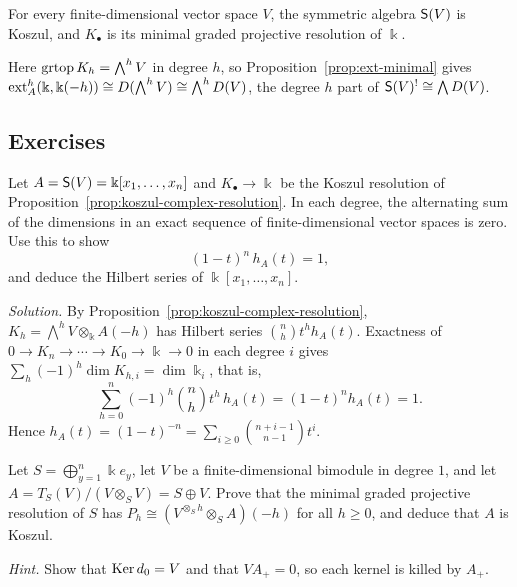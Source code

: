 \begin{corollary}\label{prop:polynomial-koszul}
For every finite-dimensional vector space $V$, the symmetric algebra $\mathsf{S}(V)$ is Koszul, and $K_\bullet$ is its minimal graded projective resolution of $\Bbbk$.
\end{corollary}

Here $\operatorname{grtop}\nolimits K_h=\bigwedge^hV$ in degree $h$, so Proposition~\ref{prop:ext-minimal} gives $\operatorname{ext}\nolimits_A^h(\Bbbk,\Bbbk(-h))\cong D(\bigwedge^hV)\cong\bigwedge^hD(V)$, the degree $h$ part of $\mathsf{S}(V)^!\cong\bigwedge D(V)$.

\subsection{Exercises}

\begin{exercise}\label{ex:hilbert-polynomial}
Let $A=\mathsf{S}(V)=\Bbbk[x_1,\ldots,x_n]$ and $K_\bullet\to\Bbbk$ be the Koszul resolution of Proposition~\ref{prop:koszul-complex-resolution}.
In each degree, the alternating sum of the dimensions in an exact sequence of finite-dimensional vector spaces is zero.
Use this to show
\[
(1-t)^n\,h_A(t)=1,
\]
and deduce the Hilbert series of $\Bbbk[x_1,\ldots,x_n]$.
\end{exercise}

\begin{hidden}
\emph{Solution.}
By Proposition~\ref{prop:koszul-complex-resolution}, $K_h=\bigwedge^hV\otimes_\Bbbk A(-h)$ has Hilbert series $\binom nh t^hh_A(t)$.
Exactness of $0\to K_n\to\cdots\to K_0\to\Bbbk\to0$ in each degree $i$ gives $\sum_h(-1)^h\dim K_{h,i}=\dim\Bbbk_i$, that is,
\[
\sum_{h=0}^n(-1)^h\binom nht^h\,h_A(t)=(1-t)^nh_A(t)=1.
\]
Hence $h_A(t)=(1-t)^{-n}=\sum_{i\geq0}\binom{n+i-1}{n-1}t^i$.
\end{hidden}



\begin{exercise}\label{ex:square-zero-koszul}
Let $S=\bigoplus_{y=1}^n\Bbbk e_y$, let $V$ be a finite-dimensional bimodule in degree $1$, and let $A=T_S(V)/(V\otimes_SV)=S\oplus V$.
Prove that the minimal graded projective resolution of $S$ has $P_h\cong(V^{\otimes_Sh}\otimes_SA)(-h)$ for all $h\geq0$, and deduce that $A$ is Koszul.

\emph{Hint.} Show that $\operatorname{Ker}\nolimits d_0=V$ and that $VA_+=0$, so each kernel is killed by $A_+$.
\end{exercise}

